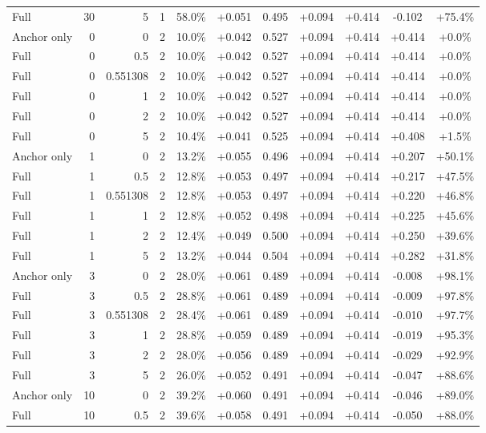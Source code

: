 \begin{table}[htbp]
\begin{tabular}{lrrrccccccc}
Full & 30 & 5 & 1 & 58.0\% & +0.051 & 0.495 & +0.094 & +0.414 & -0.102 & +75.4\% \\
Anchor only & 0 & 0 & 2 & 10.0\% & +0.042 & 0.527 & +0.094 & +0.414 & +0.414 & +0.0\% \\
Full & 0 & 0.5 & 2 & 10.0\% & +0.042 & 0.527 & +0.094 & +0.414 & +0.414 & +0.0\% \\
Full & 0 & 0.551308 & 2 & 10.0\% & +0.042 & 0.527 & +0.094 & +0.414 & +0.414 & +0.0\% \\
Full & 0 & 1 & 2 & 10.0\% & +0.042 & 0.527 & +0.094 & +0.414 & +0.414 & +0.0\% \\
Full & 0 & 2 & 2 & 10.0\% & +0.042 & 0.527 & +0.094 & +0.414 & +0.414 & +0.0\% \\
Full & 0 & 5 & 2 & 10.4\% & +0.041 & 0.525 & +0.094 & +0.414 & +0.408 & +1.5\% \\
Anchor only & 1 & 0 & 2 & 13.2\% & +0.055 & 0.496 & +0.094 & +0.414 & +0.207 & +50.1\% \\
Full & 1 & 0.5 & 2 & 12.8\% & +0.053 & 0.497 & +0.094 & +0.414 & +0.217 & +47.5\% \\
Full & 1 & 0.551308 & 2 & 12.8\% & +0.053 & 0.497 & +0.094 & +0.414 & +0.220 & +46.8\% \\
Full & 1 & 1 & 2 & 12.8\% & +0.052 & 0.498 & +0.094 & +0.414 & +0.225 & +45.6\% \\
Full & 1 & 2 & 2 & 12.4\% & +0.049 & 0.500 & +0.094 & +0.414 & +0.250 & +39.6\% \\
Full & 1 & 5 & 2 & 13.2\% & +0.044 & 0.504 & +0.094 & +0.414 & +0.282 & +31.8\% \\
Anchor only & 3 & 0 & 2 & 28.0\% & +0.061 & 0.489 & +0.094 & +0.414 & -0.008 & +98.1\% \\
Full & 3 & 0.5 & 2 & 28.8\% & +0.061 & 0.489 & +0.094 & +0.414 & -0.009 & +97.8\% \\
Full & 3 & 0.551308 & 2 & 28.4\% & +0.061 & 0.489 & +0.094 & +0.414 & -0.010 & +97.7\% \\
Full & 3 & 1 & 2 & 28.8\% & +0.059 & 0.489 & +0.094 & +0.414 & -0.019 & +95.3\% \\
Full & 3 & 2 & 2 & 28.0\% & +0.056 & 0.489 & +0.094 & +0.414 & -0.029 & +92.9\% \\
Full & 3 & 5 & 2 & 26.0\% & +0.052 & 0.491 & +0.094 & +0.414 & -0.047 & +88.6\% \\
Anchor only & 10 & 0 & 2 & 39.2\% & +0.060 & 0.491 & +0.094 & +0.414 & -0.046 & +89.0\% \\
Full & 10 & 0.5 & 2 & 39.6\% & +0.058 & 0.491 & +0.094 & +0.414 & -0.050 & +88.0\% \\

\end{tabular}
\end{table}
